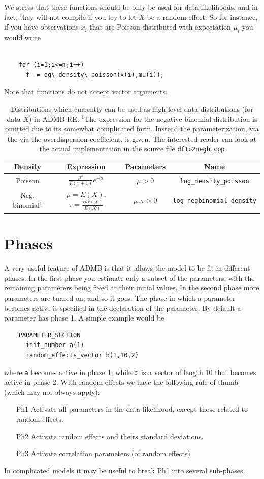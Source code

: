 \documentclass[12pt,letter,reqno]{book}
\begin{document}
We stress that these functions should be only be used for data likelihoods,
and in fact, they will not compile if you try to let $X$ be a random effect.
So for instance, if you have observations $x_i$ that are Poisson
distributed with expectation $\mu_i$ you would write
\begin{lstlisting}

    for (i=1;i<=n;i++)
      f -= og\_density\_poisson(x(i),mu(i));

\end{lstlisting}
Note that functions do not accept vector arguments.


\begin{table}
\begin{tabular}{cccc}
\hline 
Density & Expression & Parameters & Name\tabularnewline
\hline
Poisson & $\frac{\mu^{x}}{\Gamma(x+1)}e^{-\mu}$  & $\mu>0$ & \texttt{log\_density\_poisson}\\
Neg. binomial$^{1}$ & $\mu=E(X)$, $\tau=\frac{Var(X)}{E(X)}$ & $\mu,\tau>0$ & \texttt{log\_negbinomial\_density}\\
\hline
\end{tabular}\caption{Distributions which currently can be
used as high-level data distributions (for data $X$) in ADMB-RE. $^{1}$The expression for the
negative binomial distribution is omitted due to its somewhat complicated
form. Instead the parameterization, via the via the overdispersion
coefficient, is given. The interested reader can look at the actual
implementation in the source file \texttt{df1b2negb.cpp}
\label{tab:distributions}}

\end{table}


\section{Phases}
A very useful feature of ADMB is that it allows the model to be fit in different phases. In the
first phase you estimate only a subset of the parameters, with the remaining parameters being fixed at their
initial values. In the second phase more parameters are turned on, and so it goes. The phase in which a parameter
becomes active is specified in the declaration of the parameter. By default a parameter has phase 1. A simple
example would be
\begin{lstlisting}
    PARAMETER_SECTION
      init_number a(1)
      random_effects_vector b(1,10,2)
\end{lstlisting}
where \texttt{a} becomes active in phase 1, while \texttt{b}\ is a vector of length 10 that becomes active in phase 2. 
With random effects we have the following rule-of-thumb (which may not always apply):
\begin{itemize}
\item[Ph1] Activate all parameters in the data likelihood, except those related to random effects.
\item[Ph2] Activate random effects and theirs standard deviations.
\item[Ph3] Activate correlation parameters (of random effects)
\end{itemize}
In complicated models it may be useful to break Ph1 into several sub-phases. 
\end{document}
